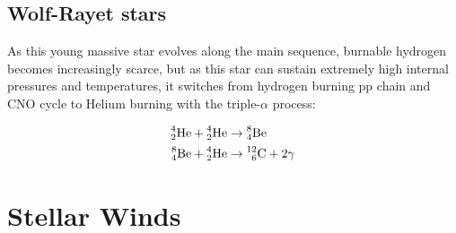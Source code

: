 

\cite{ward-thompsonIntroductionStarFormation2011}





\subsection{Wolf-Rayet stars}
\label{sec:wrtype}

As this young massive star evolves along the main sequence, burnable hydrogen becomes increasingly scarce,  but as this star can sustain extremely high internal pressures and temperatures, it switches from hydrogen burning pp chain and CNO cycle to Helium burning with the triple-$\alpha$ process:



\begin{subequations}
  \begin{align}
    \prescript{4}{2}{\text{He}} + \prescript{4}{2}{\text{He}} & \rightarrow \prescript{8}{4}{\text{Be}} \\
    \prescript{8}{4}{\text{Be}} + \prescript{4}{2}{\text{He}} & \rightarrow \prescript{12}{6}{\text{C}} + 2\gamma
  \end{align}
\end{subequations}

\cite{ryanStellarEvolutionNucleosynthesis2010a}






\section{Stellar Winds}
\label{sec:winds}

